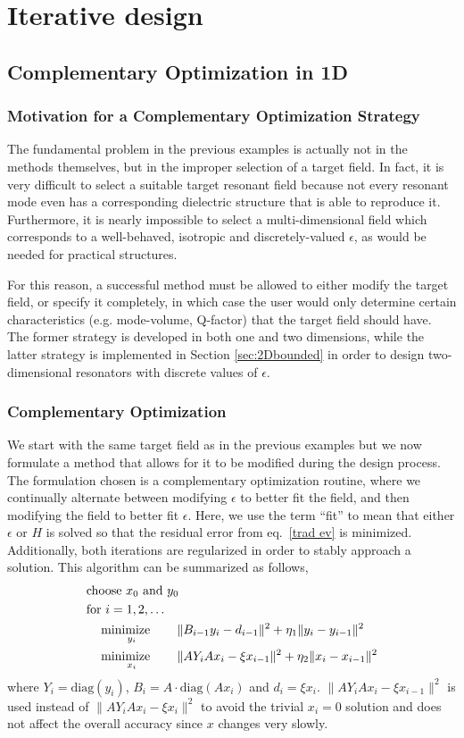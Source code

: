 \chapter{Iterative design}
\section{Complementary Optimization in 1D}
\subsection{Motivation for a Complementary Optimization Strategy}
The fundamental problem in the previous examples is actually not in the methods themselves, but in the improper selection of a target field. In fact, it is very difficult to select a suitable target resonant field because not every resonant mode even has a corresponding dielectric structure that is able to reproduce it. Furthermore, it is nearly impossible to select a multi-dimensional field which corresponds to a well-behaved, isotropic and discretely-valued $\epsilon$, as would be needed for practical structures. 

For this reason, a successful method must be allowed to either modify the target field, or specify it completely, in which case the user would only determine certain characteristics (e.g. mode-volume, Q-factor) that the target field should have. The former strategy is developed in both one and two dimensions, while the latter strategy is implemented in Section \ref{sec:2Dbounded} in order to design two-dimensional resonators with discrete values of $\epsilon$.

\subsection{Complementary Optimization}\label{sec:comp}
We start with the same target field as in the previous examples but we now formulate a method that allows for it to be modified during the design process. The formulation chosen is a complementary optimization routine, where we continually alternate between modifying $\epsilon$ to better fit the field, and then modifying the field to better fit $\epsilon$. Here, we use the term ``fit'' to mean that either $\epsilon$ or $H$ is solved so that the residual error from eq.~\eqref{trad ev} is minimized. Additionally, both iterations are regularized in order to stably approach a solution. This algorithm can be summarized as follows, 
\begin{align}
&\text{choose $x_0$ and $y_0$} \nonumber \\
&\text{for } i = 1, 2, \ldots \nonumber \\
&\quad\operatorname*{\text{minimize}\quad}_{y_i}\quad \|B_{i-1} y_i-d_{i-1}\|^2 + \eta_1\|y_i-y_{i-1}\|^2 \label{comp1}\\
&\quad\operatorname*{\text{minimize}\quad}_{x_i}\quad \|A Y_i A x_i - \xi x_{i-1}\|^2 + \eta_2\|x_i-x_{i-1}\|^2 \label{comp2}
\end{align}
where $Y_i = \text{diag}(y_i)$, $B_i = A \cdot \text{diag}(A x_i)$ and $d_i = \xi x_i$. $\|A Y_i A x_i - \xi x_{i-1}\|^2$ is used instead of $\|A Y_i A x_i - \xi x_{i}\|^2$ to avoid the trivial $x_i = 0$ solution and does not affect the overall accuracy since $x$ changes very slowly. 

